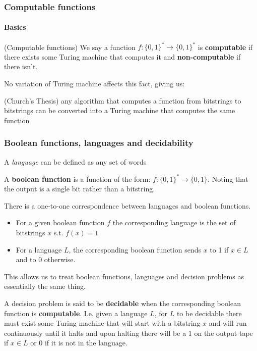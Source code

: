 \documentclass{beamer}
\begin{document}
\begin{frame}
  \frametitle{Computable functions}
  \framesubtitle{Basics}

  \begin{definition}(Computable functions)
    We say a function $f : \{ 0,1 \} ^{*} \rightarrow \{ 0,1 \} ^{*}$ is \textbf{computable} if there exists some Turing machine that computes it and \textbf{non-computable} if there isn't.
  \end{definition}

  No variation of Turing machine affects this fact, giving us:

  \begin{thesis}(Church's Thesis)
    any algorithm that computes a function from bitstrings to bitstrings can be converted into a Turing machine that computes the same function
  \end{thesis}
\end{frame}

\begin{frame}[allowframebreaks]
  \frametitle{Boolean functions, languages and decidability}

  \begin{definition}
    A \textit{language} can be defined as any set of words
  \end{definition}

  \begin{definition}
    A \textbf{boolean function} is a function of the form: $f : \{ 0,1 \}^{*} \rightarrow \{ 0,1 \} $. Noting that the output is a single bit rather than a bitstring.
  \end{definition}

  There is a one-to-one correspondence between languages and boolean functions.
\begin{itemize}
  \item For a given boolean function $f$ the corresponding language is the set of bitstrings $x$ s.t. $f(x) = 1$
  \item For a language $L$, the corresponding boolean function sends $x$ to 1 if $x \in L$ and to $0$ otherwise.
\end{itemize}

This allows us to treat boolean functions, languages and decision problems as essentially the same thing.

A decision problem is said to be \textbf{decidable} when the corresponding boolean function is \textbf{computable}. I.e. given a language $L$, for $L$ to be decidable there must exist some Turing machine that will start with a bitstring $x$ and will run continuously until it halts and upon halting there will be a $1$ on the output tape if $x \in L$ or $0$ if it is not in the language.
\end{frame}
\end{document}
